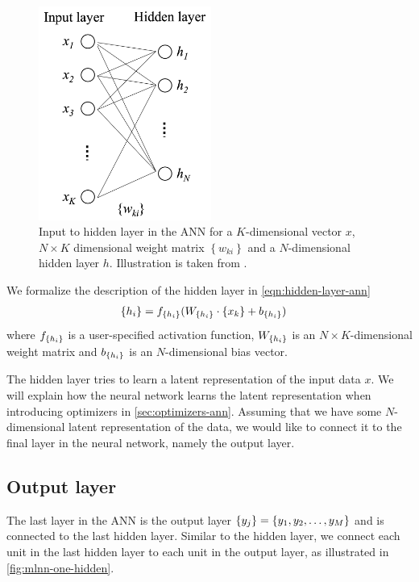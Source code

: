 \begin{figure}[H]
    \centering
    \includegraphics[height=7cm]{thesis/figures/ann-input-hidden-layer-rong-2014.png}
    \caption{Input to hidden layer in the ANN for a $K$-dimensional vector $x$, $N\times K$ dimensional weight matrix $\left\{ w_{ki} \right\}$ and a $N$-dimensional hidden layer $h$. Illustration is taken from \cite[Figure 6]{rong2016word2vec}.}
    \label{fig:hidden_layer_ann}
\end{figure}

We formalize the description of the hidden layer in \cref{eqn:hidden-layer-ann}
\begin{align}
    \label{eqn:hidden-layer-ann}
    \left\{ {h}_{i} \right\} &= f_{\left\{ {h}_{i} \right\}}(W_{\left\{ {h}_{i} \right\}} \cdot \left\{ {x}_{k} \right\} + b_{\left\{ {h}_{i} \right\}})
\end{align}
where $f_{\left\{ {h}_{i} \right\}}$ is a user-specified activation function, $W_{\left\{ {h}_{i} \right\}}$ is an $N \times K$-dimensional weight matrix and $b_{\left\{ {h}_{i} \right\}}$ is an $N$-dimensional bias vector.

The hidden layer tries to learn a latent representation of the input data $x$. We will explain how the neural network learns the latent representation when introducing optimizers in \cref{sec:optimizers-ann}. Assuming that we have some $N$-dimensional latent representation of the data, we would like to connect it to the final layer in the neural network, namely the output layer.

\subsection{Output layer}
The last layer in the ANN is the output layer $\left\{ {y}_{j} \right\} = \left\{ y_1, y_2, \ldots, y_M \right\}$ and is connected to the last hidden layer. Similar to the hidden layer, we connect each unit in the last hidden layer to each unit in the output layer, as illustrated in \cref{fig:mlnn-one-hidden}.

